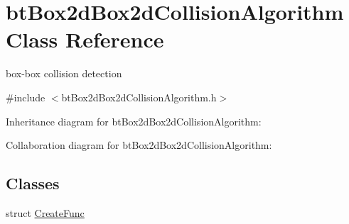 \hypertarget{classbt_box2d_box2d_collision_algorithm}{\section{bt\+Box2d\+Box2d\+Collision\+Algorithm Class Reference}
\label{classbt_box2d_box2d_collision_algorithm}
}


box-\/box collision detection  




{\ttfamily \#include $<$bt\+Box2d\+Box2d\+Collision\+Algorithm.\+h$>$}



Inheritance diagram for bt\+Box2d\+Box2d\+Collision\+Algorithm\+:


Collaboration diagram for bt\+Box2d\+Box2d\+Collision\+Algorithm\+:
\subsection*{Classes}
\begin{DoxyCompactItemize}
\item 
struct \hyperlink{structbt_box2d_box2d_collision_algorithm_1_1_create_func}{Create\+Func}
\end{DoxyCompactItemize}

